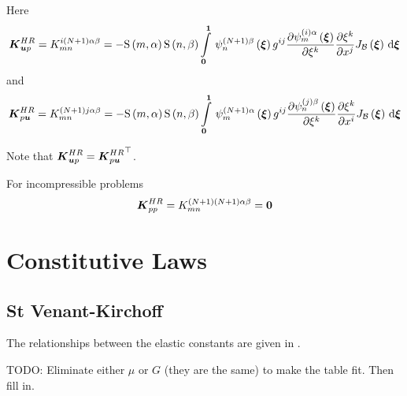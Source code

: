 Here
\begin{equation}
  \matr{K}^{HR}_{\vectr{u}p}=K^{i\pbrac{N+1}\alpha\beta}_{mn}=-\gsf{m}{\alpha}\gsf{n}{\beta}\gint{\vectr{0}}{\vectr{1}}{\idxgbfn{\pbrac{N+1}}{n}{\beta}{\vectr{\xi}}g^{ij}\delby{\idxgbfn{\pbrac{i}}{m}{\alpha}{\vectr{\xi}}}{\xi^{k}}\delby{\xi^{k}}{x^{j}}\fnof{J_{\embedmanifold{B}}}{\vectr{\xi}}}{\vectr{\xi}}
\end{equation}
and
\begin{equation}
  \matr{K}^{HR}_{p\vectr{u}}=K^{\pbrac{N+1}j\alpha\beta}_{mn}=-\gsf{m}{\alpha}\gsf{n}{\beta}\gint{\vectr{0}}{\vectr{1}}{\idxgbfn{\pbrac{N+1}}{m}{\alpha}{\vectr{\xi}}g^{ij}\delby{\idxgbfn{\pbrac{j}}{n}{\beta}{\vectr{\xi}}}{\xi^{k}}\delby{\xi^{k}}{x^{i}}\fnof{J_{\embedmanifold{B}}}{\vectr{\xi}}}{\vectr{\xi}}
\end{equation}

Note that $\matr{K}^{HR}_{\vectr{u}p}=\transpose{\matr{K}^{HR}_{p\vectr{u}}}$.

For incompressible problems
\begin{equation}
  \matr{K}^{HR}_{pp}=K^{\pbrac{N+1}\pbrac{N+1}\alpha\beta}_{mn}=\matr{0}
\end{equation}

\section{Constitutive Laws}

\subsection{St Venant-Kirchoff}

The relationships between the elastic constants are given in .

TODO: Eliminate either $\mu$ or $G$ (they are the same) to make the table
fit. Then fill in.

